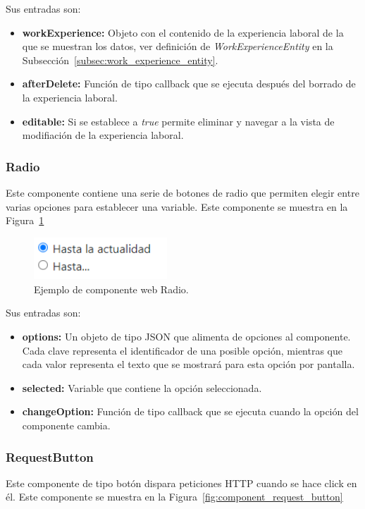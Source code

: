 \documentclass[a4paper, 12pt]{book}
\begin{document}
Sus entradas son:

		\begin{itemize}
		\item \textbf{workExperience:} Objeto con el contenido de la experiencia laboral de la que se muestran los datos, ver definición de \emph{WorkExperienceEntity} en la Subsección~\ref{subsec:work_experience_entity}.
		\item \textbf{afterDelete:} Función de tipo callback que se ejecuta después del borrado de la experiencia laboral.
		\item \textbf{editable:} Si se establece a \emph{true} permite eliminar y navegar a la vista de modifiación de la experiencia laboral.
		\end{itemize}


\subsubsection{Radio}
\label{subsec:wc_radio}
Este componente contiene una serie de botones de radio que permiten elegir entre varias opciones para establecer una variable.
Este componente se muestra en la Figura~\ref{fig:component_radio}

\begin{figure}
  \centering
  \includegraphics[width=5cm, keepaspectratio]{img/Radio.PNG}
  \caption{Ejemplo de componente web Radio.}\label{fig:component_radio}
\end{figure}

Sus entradas son:

		\begin{itemize}
		\item \textbf{options:} Un objeto de tipo JSON que alimenta de opciones al componente. Cada clave representa el identificador de una posible opción, mientras que cada valor representa el texto que se mostrará para esta opción por pantalla.
		\item \textbf{selected:} Variable que contiene la opción seleccionada.
		\item \textbf{changeOption:} Función de tipo callback que se ejecuta cuando la opción del componente cambia.
		\end{itemize}

\subsubsection{RequestButton}
\label{subsec:wc_request_button}
Este componente de tipo botón dispara peticiones HTTP cuando se hace click en él.
Este componente se muestra en la Figura~\ref{fig:component_request_button}
\end{document}
